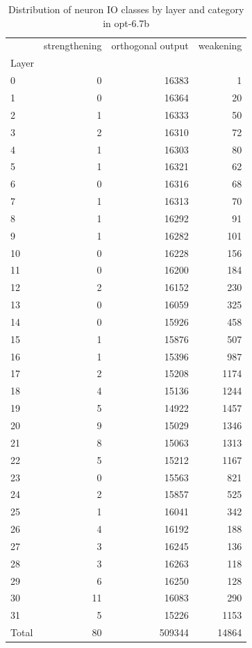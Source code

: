 \begin{table}
\caption{Distribution of neuron IO classes by layer and category in opt-6.7b}
\label{tab:opt-6.7b}
\begin{tabular}{lrrr}
 & strengthening & orthogonal output & weakening \\
Layer &  &  &  \\
0 & 0 & 16383 & 1 \\
1 & 0 & 16364 & 20 \\
2 & 1 & 16333 & 50 \\
3 & 2 & 16310 & 72 \\
4 & 1 & 16303 & 80 \\
5 & 1 & 16321 & 62 \\
6 & 0 & 16316 & 68 \\
7 & 1 & 16313 & 70 \\
8 & 1 & 16292 & 91 \\
9 & 1 & 16282 & 101 \\
10 & 0 & 16228 & 156 \\
11 & 0 & 16200 & 184 \\
12 & 2 & 16152 & 230 \\
13 & 0 & 16059 & 325 \\
14 & 0 & 15926 & 458 \\
15 & 1 & 15876 & 507 \\
16 & 1 & 15396 & 987 \\
17 & 2 & 15208 & 1174 \\
18 & 4 & 15136 & 1244 \\
19 & 5 & 14922 & 1457 \\
20 & 9 & 15029 & 1346 \\
21 & 8 & 15063 & 1313 \\
22 & 5 & 15212 & 1167 \\
23 & 0 & 15563 & 821 \\
24 & 2 & 15857 & 525 \\
25 & 1 & 16041 & 342 \\
26 & 4 & 16192 & 188 \\
27 & 3 & 16245 & 136 \\
28 & 3 & 16263 & 118 \\
29 & 6 & 16250 & 128 \\
30 & 11 & 16083 & 290 \\
31 & 5 & 15226 & 1153 \\
Total & 80 & 509344 & 14864 \\
\end{tabular}
\end{table}
